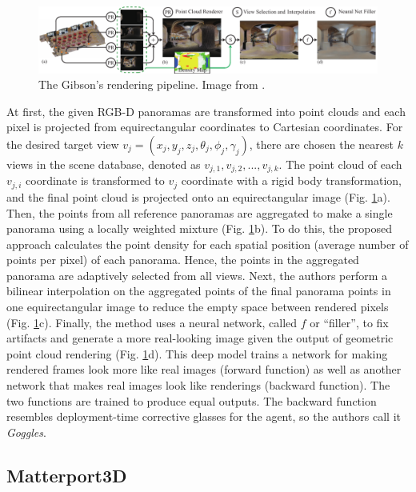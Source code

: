 \begin{figure}[h!]
	\centering
	\includegraphics[width=\linewidth]{images/gibson_rendering_pipeline.pdf}
	\caption{The Gibson's rendering pipeline. Image from \cite{gibson}.}
	\label{fig:gibsonrenderingpipeline}
\end{figure}
At first, the given RGB-D panoramas are transformed into point clouds and each pixel is projected from equirectangular coordinates to Cartesian coordinates. For the desired target view $v_j =
(x_j , y_j , z_j , \theta_j, \phi_j, \gamma_j )$, there are chosen the nearest $k$ views in the
scene database, denoted as $v_{j,1}, v_{j,2}, ..., v_{j,k}$. The point cloud of each $v_{j,i}$ coordinate is transformed to $v_j$ coordinate with a rigid body transformation, and the final point cloud is projected onto an equirectangular image (Fig. \ref{fig:gibsonrenderingpipeline}a). Then, the points from all reference panoramas are aggregated to make a single panorama using a locally weighted mixture (Fig. \ref{fig:gibsonrenderingpipeline}b). To do this, the proposed approach calculates the point density for each spatial position (average number of points per pixel) of each panorama. Hence, the points in the aggregated panorama are adaptively selected from all views. Next, the authors perform a bilinear interpolation on the aggregated points of the final panorama
points in one equirectangular image to reduce the empty space between rendered pixels (Fig. \ref{fig:gibsonrenderingpipeline}c). Finally, the method uses a neural network, called $f$ or ``filler'', to fix artifacts and generate a more real-looking image given the output of geometric point cloud rendering (Fig. \ref{fig:gibsonrenderingpipeline}d). This deep model trains a network for making rendered frames look more like real images (forward function) as well as another network that makes real images look like renderings (backward function). The two functions are trained to produce equal outputs. The backward function resembles deployment-time corrective
glasses for the agent, so the authors call it \textit{Goggles}.

\subsection{Matterport3D}

